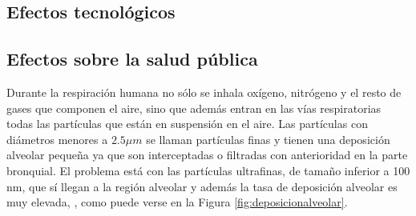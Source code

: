 %
%
%
%
%
\subsection{Efectos tecnológicos}\label{subsec:EfectosTecnologicos}

\subsection{Efectos sobre la salud pública} \label{subsec:EfectosSalud}

\par Durante la respiración humana no sólo se inhala oxígeno, nitrógeno y el resto de gases que componen el aire, sino que además entran en las vías respiratorias todas las partículas que están en suspensión en el aire. Las partículas con diámetros menores a $2.5 \mu m$ se llaman partículas finas y tienen una deposición alveolar pequeña ya que son interceptadas o filtradas con anterioridad en la parte bronquial. El problema está con las partículas ultrafinas, de tamaño inferior a 100 nm, que sí llegan a la región alveolar y además la tasa de deposición alveolar es muy elevada, \cite{leeetal:2003}, como puede verse en la Figura \ref{fig:deposicionalveolar}.

